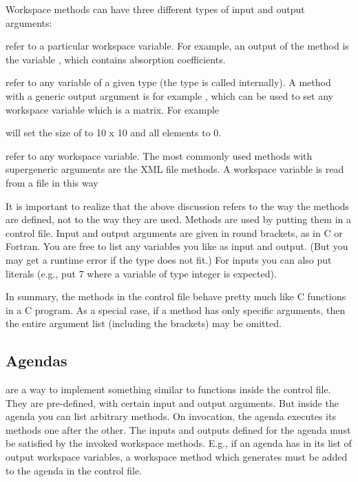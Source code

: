 Workspace methods can have three different types of input and output
arguments: 

\emph{} refer to a particular workspace
variable. For example, an output of the method
 is the variable , which
contains absorption coefficients.

\emph{} refer to any variable of a given
type (the type is called 
internally).  A method with a generic output argument is for example
, which can be used to set any workspace
variable which is a matrix. For example
\begin{quote}
\end{quote}
will set the size of  to 10 x 10 and all
elements to 0.

\emph{} refer to any workspace
variable.  The most commonly used methods with supergeneric arguments
are the XML file methods. A workspace variable is read from a file in
this way
\begin{quote}
\end{quote}

It is important to realize that the above discussion refers to the way
the methods are defined, not to the way they are used. Methods are
used by putting them in a control file. Input and output arguments are
given in round brackets, as in C or Fortran. You are free to list any
variables you like as input and output. (But you may get a runtime
error if the type does not fit.) For inputs you can also put literals
(e.g., put 7 where a variable of type integer is expected). 

In summary, the methods in the control file behave pretty much like C
functions in a C program. As a special case, if a method has only
specific arguments, then the entire argument list (including the
brackets) may be omitted.


\subsection{Agendas}

 are a way to implement something similar to
functions inside the control file. They are pre-defined, with certain
input and output arguments. But inside the agenda you can list
arbitrary methods. On invocation, the agenda executes its methods one
after the other. The inputs and outputs defined for the agenda must be
satisfied by the invoked workspace methods. E.g., if an agenda has
 in its list of output workspace variables, a
workspace method which generates  must be added to
the agenda in the control file.

